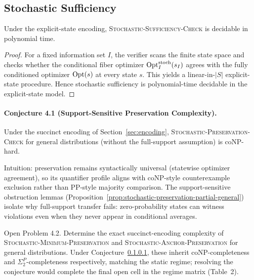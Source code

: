 \subsection{Stochastic Sufficiency}

\begin{theorem}\label{thm:stochastic-preservation-explicit}
Under the explicit-state encoding, \textsc{Stochastic-Sufficiency-Check} is decidable in polynomial time.
\end{theorem}


\begin{proof}
For a fixed information set $I$, the verifier scans the finite state space and checks whether the conditional fiber optimizer $\mathrm{Opt}^{\mathrm{stoch}}_I(s_I)$ agrees with the fully conditioned optimizer $\mathrm{Opt}(s)$ at every state $s$. This yields a linear-in-$|S|$ explicit-state procedure.  Hence stochastic sufficiency is polynomial-time decidable in the explicit-state model.
\end{proof}

\paragraph{Conjecture 4.1 (Support-Sensitive Preservation Complexity).}\label{con:succinct-soundness}
Under the succinct encoding of Section~\ref{sec:encoding}, \textsc{Stochastic-Preservation-Check}
for general distributions (without the full-support assumption) is coNP-hard.

Intuition: preservation remains syntactically universal (statewise optimizer agreement), so its quantifier profile aligns with coNP-style counterexample exclusion rather than PP-style majority comparison. The support-sensitive obstruction lemmas (Proposition~\ref{prop:stochastic-preservation-partial-general}) isolate why full-support transfer fails: zero-probability states can witness violations even when they never appear in conditional averages. 

Open Problem 4.2.\label{prob:minimum-succinct} Determine the exact succinct-encoding complexity of
\textsc{Stochastic-Minimum-Preservation} and \textsc{Stochastic-Anchor-Preservation}
for general distributions. Under Conjecture~\ref{con:succinct-soundness}, these inherit coNP-completeness and
$\Sigma_2^P$-completeness respectively, matching the static regime; resolving the conjecture
would complete the final open cell in the regime matrix (Table~2).

